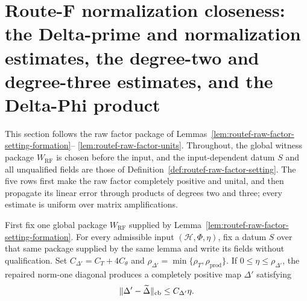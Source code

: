 \section{Route-F normalization closeness: the Delta-prime and normalization estimates, the degree-two and degree-three estimates, and the Delta-Phi product}\label{sec:routef-normalization-closeness}

This section follows the raw factor package of Lemmas~\ref{lem:routef-raw-factor-setting-formation}--
\ref{lem:routef-raw-factor-units}.  Throughout, the global witness package $W_{\mathrm{RF}}$
is chosen before the input, and the input-dependent datum $S$ and all unqualified fields are
those of Definition~\ref{def:routef-raw-factor-setting}.  The five rows first make the raw
factor completely positive and unital, and then propagate its linear error through products
of degrees two and three; every estimate is uniform over matrix amplifications.

\begin{lemma}\label{lem:routef-delta-prime-closeness}
First fix one global package $W_{\mathrm{RF}}$ supplied by
Lemma~\ref{lem:routef-raw-factor-setting-formation}.  For every admissible input
$(\mathcal H,\Phi,\eta)$, fix a datum $S$ over that same package supplied by the same lemma
and write its fields without qualification.  Set
$C_{\Delta'}=C_T+4C_\theta$ and $\rho_{\Delta'}=\min\{\rho_T,\rho_{\mathrm{prod}}\}$.
If $0\le\eta\le\rho_{\Delta'}$, the repaired norm-one diagonal produces a completely
positive map $\Delta'$ satisfying
\[
  \lVert \Delta'-\widetilde\Delta\rVert_{\mathrm{cb}}\le C_{\Delta'}\eta .
\]
\end{lemma}

